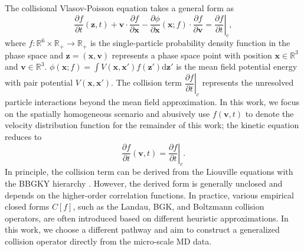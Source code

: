 \documentclass[preprint,1p,times]{elsarticle}
\theoremstyle{definition}
\theoremstyle{remark}
\begin{document}
The collisional Vlasov-Poisson equation takes a general form as
\begin{equation}\label{eq:VP}
	\dfrac{\partial f}{\partial t}(\boldsymbol{z},t) +\boldsymbol{v} \cdot \dfrac{\partial f}{\partial \boldsymbol{x}} - \dfrac{\partial \phi}{\partial \boldsymbol{x}}(\boldsymbol{x}; f) \cdot \dfrac{\partial f}{\partial \boldsymbol{v}} =\left.\dfrac{\partial f}{\partial t}\right|_{c},
\end{equation}
where $f:\mathbb{R}^6\times \mathbb{R}_{+} \to \mathbb{R}_{+}$ is the single-particle probability density function in the phase space and $\boldsymbol{z}=(\boldsymbol{x},\boldsymbol{v})$ represents a phase space point with position $\boldsymbol{x} \in \mathbb{R}^3$ and $\boldsymbol{v} \in \mathbb{R}^3$.  $\phi(\boldsymbol{x} ;f)=\int V(\boldsymbol{x},\boldsymbol{x}')f(\boldsymbol{z}')\mathrm{d}\boldsymbol{z}'$ is the mean field potential energy with pair potential $V(\boldsymbol{x}, \boldsymbol{x}')$.
The collision term $\left.\dfrac{\partial f}{\partial t}\right|_{c}$ represents the unresolved particle interactions beyond the mean field approximation. In this work, we focus on the spatially homogeneous scenario and abusively use $f(\boldsymbol{v}, t)$ to denote the velocity distribution function for the remainder of this work; the kinetic equation reduces to
\begin{equation}\label{eq:collision}
	\dfrac{\partial f}{\partial t}(\boldsymbol{v},t) = \left.\dfrac{\partial f}{\partial t}\right|_{c}.
\end{equation}
In principle, the collision term can be derived from the Liouville equations with the BBGKY hierarchy \cite{kirkwood1946statistical, kirkwood1947statistical, bogoliubov1947kinetic, bhatnagar1954model}. However, the derived form is generally unclosed and depends on the higher-order correlation functions. In practice, various empirical closed forms $C[f]$, such as the Landau, BGK, and Boltzmann collision operators, are often introduced based on different heuristic approximations. In this work, we choose a different pathway and aim to construct a generalized collision operator directly from the micro-scale MD data. 
\end{document}
